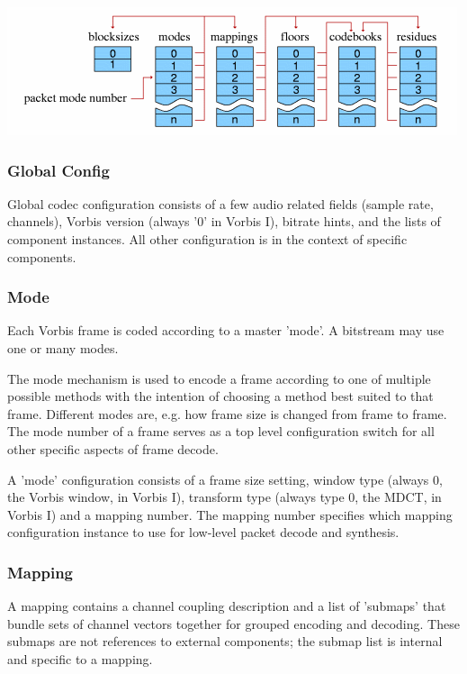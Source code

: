 \begin{center}
\includegraphics[width=\textwidth]{components}
\end{center}

\subsubsection{Global Config}
Global codec configuration consists of a few audio related fields
(sample rate, channels), Vorbis version (always '0' in Vorbis I),
bitrate hints, and the lists of component instances.  All other
configuration is in the context of specific components.

\subsubsection{Mode}

Each Vorbis frame is coded according to a master 'mode'.  A bitstream
may use one or many modes.

The mode mechanism is used to encode a frame according to one of
multiple possible methods with the intention of choosing a method best
suited to that frame.  Different modes are, e.g. how frame size
is changed from frame to frame. The mode number of a frame serves as a
top level configuration switch for all other specific aspects of frame
decode.

A 'mode' configuration consists of a frame size setting, window type
(always 0, the Vorbis window, in Vorbis I), transform type (always
type 0, the MDCT, in Vorbis I) and a mapping number.  The mapping
number specifies which mapping configuration instance to use for
low-level packet decode and synthesis.


\subsubsection{Mapping}

A mapping contains a channel coupling description and a list of
'submaps' that bundle sets of channel vectors together for grouped
encoding and decoding. These submaps are not references to external
components; the submap list is internal and specific to a mapping.

